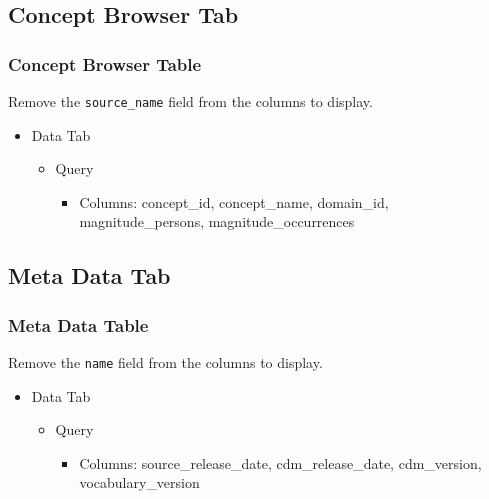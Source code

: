 \documentclass[
]{book}
\providecommand{\tightlist}{%
  \setlength{\itemsep}{0pt}\setlength{\parskip}{0pt}}
\begin{document}
\hypertarget{concept-browser-tab-1}{%
\subsection*{Concept Browser Tab}\label{concept-browser-tab-1}}

\hypertarget{concept-browser-table-1}{%
\subsubsection*{Concept Browser Table}\label{concept-browser-table-1}}

Remove the \texttt{source\_name} field from the columns to display.

\begin{itemize}
\tightlist
\item
  Data Tab

  \begin{itemize}
  \tightlist
  \item
    Query

    \begin{itemize}
    \tightlist
    \item
      Columns: concept\_id, concept\_name, domain\_id, magnitude\_persons, magnitude\_occurrences
    \end{itemize}
  \end{itemize}
\end{itemize}

\hypertarget{meta-data-tab-1}{%
\subsection*{Meta Data Tab}\label{meta-data-tab-1}}

\hypertarget{meta-data-table-1}{%
\subsubsection*{Meta Data Table}\label{meta-data-table-1}}

Remove the \texttt{name} field from the columns to display.

\begin{itemize}
\tightlist
\item
  Data Tab

  \begin{itemize}
  \tightlist
  \item
    Query

    \begin{itemize}
    \tightlist
    \item
      Columns: source\_release\_date, cdm\_release\_date, cdm\_version, vocabulary\_version
    \end{itemize}
  \end{itemize}
\end{itemize}
\end{document}
